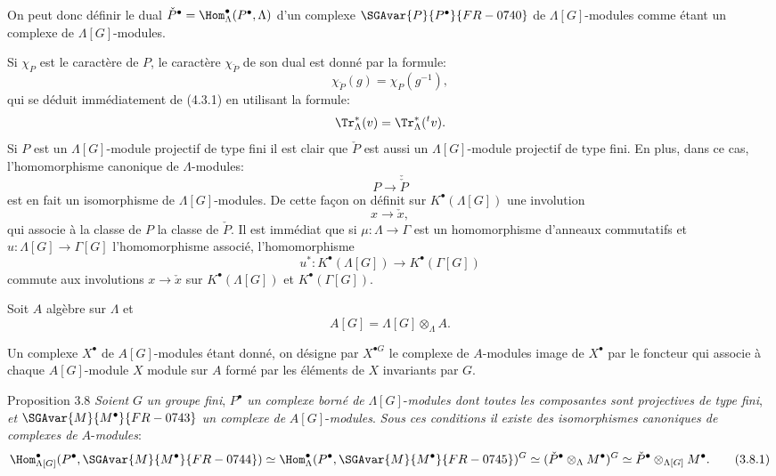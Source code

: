 On peut donc définir le dual $\check P^\bullet=\Hom_\Lambda^\bullet(P^\bullet,\Lambda)$ d'un complexe $\SGAvar{P}{P^\bullet}{FR-0740}$ de $\Lambda[G]$-modules comme étant un complexe de $\Lambda[G]$-modules.

Si $\chi_P$ est le caractère de $P$, le caractère $\chi_{\check P}$ de son dual est donné par la formule:
\[
\chi_{\check P}(g)=\chi_P(g^{-1}),
\tag{3.7.2}
\]
qui se déduit immédiatement de (4.3.1) en utilisant la formule:
\[
\Tr_\Lambda^*(v)=\Tr_\Lambda^*({}^{t}v).
\]
Si $P$ est un $\Lambda[G]$-module projectif de type fini il est clair que $\check P$ est aussi un $\Lambda[G]$-module projectif de type fini. En plus, dans ce cas, l'homomorphisme canonique de $\Lambda$-modules:
\[
P\longrightarrow\check{\check P}
\]
est en fait un isomorphisme de $\Lambda[G]$-modules. De cette façon on définit sur $K^{\bullet}(\Lambda[G])$ une involution
\[
x\longrightarrow \check x,
\]
qui associe à la classe de $P$ la classe de $\check P$. Il est immédiat que si $\mu:\Lambda\to\Gamma$ est un homomorphisme d'anneaux commutatifs et $u:\Lambda[G]\to\Gamma[G]$ l'homomorphisme associé, l'homomorphisme
\[
u^*:K^{\bullet}(\Lambda[G])\longrightarrow K^{\bullet}(\Gamma[G])
\]
commute aux involutions $x\longrightarrow \check x$ sur 
$K^{\bullet}(\Lambda[G])$ et $K^{\bullet}(\Gamma[G])$.

Soit $A$  algèbre sur $\Lambda$ et
\[
A[G]=\Lambda[G]\otimes_\Lambda A.
\]

Un complexe $X^\bullet$ de $A[G]$-modules étant donné, on désigne par $X^{\bullet G}$ le complexe de $A$-modules image de $X^\bullet$ par le foncteur qui associe à chaque $A[G]$-module $X$  module sur $A$ formé par les éléments de $X$ invariants par $G$.

\begin{statement}{Proposition 3.8}
\emph{Soient} $G$ \emph{un groupe fini}, $P^\bullet$ \emph{un complexe borné de} $\Lambda[G]$-\emph{modules dont toutes les composantes sont projectives de type fini}, \emph{et} $\SGAvar{M}{M^\bullet}{FR-0743}$ \emph{un complexe de} $A[G]$-\emph{modules}. \emph{Sous ces conditions il existe des isomorphismes canoniques de complexes de} $A$-\emph{modules}:
\[
\Hom_{\Lambda[G]}^\bullet(P^\bullet,\SGAvar{M}{M^\bullet}{FR-0744})
\simeq \Hom_\Lambda^\bullet(P^\bullet,\SGAvar{M}{M^\bullet}{FR-0745})^G
\simeq (\check P^\bullet\otimes_\Lambda M^\bullet)^G
\simeq \check P^\bullet\otimes_{\Lambda[G]}M^\bullet.
\tag{3.8.1}
\]
\end{statement}

